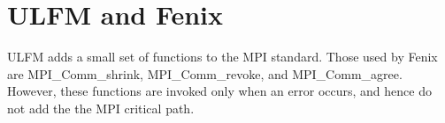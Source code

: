 \section{ULFM and Fenix}\label{sec:implem}
ULFM adds a small set of functions to the MPI standard.
Those used by Fenix are MPI\_Comm\_shrink, MPI\_Comm\_revoke, and MPI\_Comm\_agree.
However, these functions are invoked only when an error occurs, and hence do
not add the the MPI critical path.
